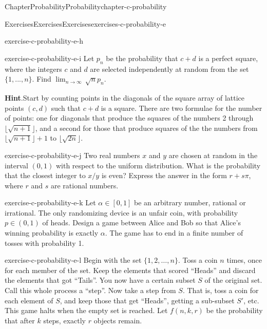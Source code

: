 \documentclass[oneside,10pt,]{book}
\newcommand{\blocktitlefont}{\relax}
\numberwithin{equation}{section}
\begin{document}
\begin{chapterptx}{Chapter}{Probability}{}{Probability}{}{}{chapter-c-probability}
\begin{exercises-section}{Exercises}{Exercises}{}{Exercises}{}{}{exercises-c-probability-e}
\begin{divisionexercise}{7}{}{}{exercise-c-probability-e-h}
\end{divisionexercise}%
\begin{divisionexercise}{8}{}{}{exercise-c-probability-e-i}%
Let \(p_n\) be the probability that \(c + d\) is a perfect square, where the integers \(c\) and \(d\) are selected independently at random from the set \(\{1, . . . , n\}\). Find \(\lim_{n\to \infty } \, \sqrt{n} p_n\).%
\par\smallskip%
\noindent\textbf{\blocktitlefont Hint}.\hypertarget{hint-c-probability-e-i-b}{}\quad{}Start by counting points in the diagonals of the square array of lattice points \((c,d)\) such that \(c+d\) is a square.  There are two formulae for the number of points: one for diagonals that produce the squares of the numbers 2 through \(\lfloor \sqrt{n+1} \rfloor\), and a second for those that produce squares of the the numbers from \(\lfloor \sqrt{n+1} \rfloor +1\) to \(\lfloor \sqrt{2n} \rfloor\).%
\end{divisionexercise}%
\begin{divisionexercise}{9}{}{}{exercise-c-probability-e-j}%
Two real numbers \(x\) and \(y\) are chosen at random in the interval \((0,1)\) with respect to the uniform distribution. What is the probability that the closest integer to \(x/y\) is even? Express the answer in the form \(r + s \pi\), where \(r\) and \(s\) are rational numbers.%
\end{divisionexercise}%
\begin{divisionexercise}{10}{}{}{exercise-c-probability-e-k}%
Let \(\alpha  \in  [0,1]\) be an arbitrary number, rational or irrational. The only randomizing device is an unfair coin, with probability \(p \in (0,1)\) of heads. Design a game between Alice and Bob so that Alice's winning probability is exactly \(\alpha\). The game has to end in a finite number of tosses with probability 1.%
\end{divisionexercise}%
\begin{divisionexercise}{11}{}{}{exercise-c-probability-e-l}%
Begin with the set \(\{1,2,\dots,n\}\). Toss a coin \(n\) times, once for each member of the set. Keep the elements that scored ``Heads'' and discard the elements that got ``Tails''. You now have a certain subset \(S\) of the original set. Call this whole process a ``step''. Now take a step from \(S\). That is, toss a coin for each element of \(S\), and keep those that get ``Heads'', getting a sub-subset \(S'\), etc. This game halts when the empty set is reached. Let \(f(n,k,r)\) be the probability that after \(k\) steps, exactly \(r\) objects remain.%

\end{divisionexercise}
\end{exercises-section}
\end{chapterptx}
\end{document}

